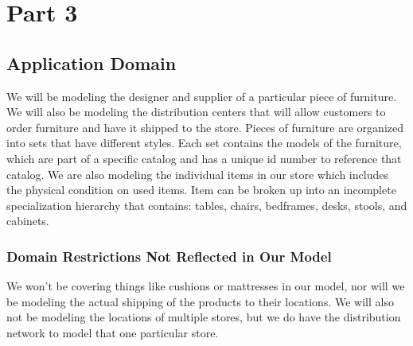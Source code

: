 \documentclass[american,extrafontsizes,12pt,portrait,letterpaper,oneside,onecolumn,final]{memoir}
\begin{document}
\chapter{Part 3}

\section{Application Domain}
We will be modeling the designer and supplier of a particular piece of furniture.
We will also be modeling the distribution centers that will allow customers to order furniture and have it shipped to the store.
Pieces of furniture are organized into sets that have different styles.
Each set contains the models of the furniture, which are part of a specific catalog and has a unique id number to reference that catalog.
We are also modeling the individual items in our store which includes the physical condition on used items.
Item can be broken up into an incomplete specialization hierarchy that contains: tables, chairs, bedframes, desks, stools, and cabinets.

\subsection{Domain Restrictions Not Reflected in Our Model}
We won't be covering things like cushions or mattresses in our model, nor will we be modeling the actual shipping of the products to their locations.
We will also not be modeling the locations of multiple stores, but we do have the distribution network to model that one particular store.

\clearpage
\end{document}
